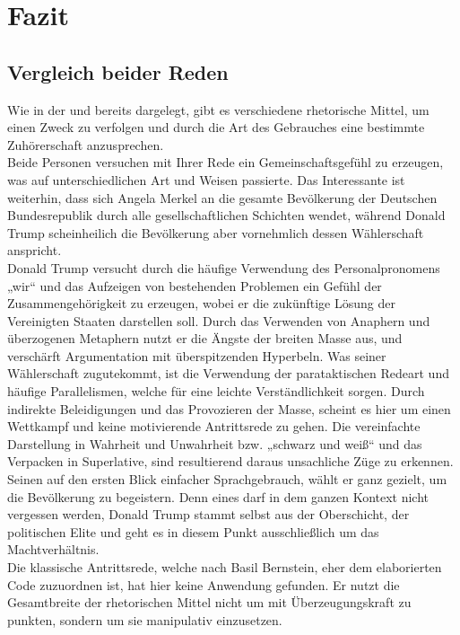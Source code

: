 \section{Fazit} 
\label{sec: Fazit}

\subsection{Vergleich beider Reden}
\label{sec: Vergleich beider Reden}

Wie in der  und  bereits dargelegt, gibt es verschiedene rhetorische Mittel, um einen Zweck zu verfolgen und durch die Art des Gebrauches eine bestimmte Zuhörerschaft anzusprechen. \\Beide Personen versuchen mit Ihrer Rede ein Gemeinschaftsgefühl zu erzeugen, was auf unterschiedlichen Art und Weisen passierte. Das Interessante ist weiterhin, dass sich Angela Merkel an die gesamte Bevölkerung der Deutschen Bundesrepublik durch alle gesellschaftlichen Schichten wendet, während Donald Trump scheinheilich die Bevölkerung aber vornehmlich dessen Wählerschaft anspricht.
\\Donald Trump versucht durch die häufige Verwendung des Personalpronomens „wir“ und das Aufzeigen von bestehenden Problemen ein Gefühl der Zusammengehörigkeit zu erzeugen, wobei er die zukünftige Lösung der Vereinigten Staaten darstellen soll. Durch das Verwenden von Anaphern und überzogenen Metaphern nutzt er die Ängste der breiten Masse aus, und verschärft Argumentation mit überspitzenden Hyperbeln. Was seiner Wählerschaft zugutekommt, ist die Verwendung der parataktischen Redeart und häufige Parallelismen,  welche für eine leichte Verständlichkeit sorgen. Durch indirekte Beleidigungen und das Provozieren der Masse, scheint es hier um einen Wettkampf und keine motivierende Antrittsrede zu gehen. Die vereinfachte Darstellung in Wahrheit und Unwahrheit bzw. „schwarz und weiß“ und das Verpacken in Superlative, sind resultierend daraus unsachliche Züge zu erkennen. Seinen auf den ersten Blick einfacher Sprachgebrauch, wählt er ganz gezielt, um die Bevölkerung zu begeistern. Denn eines darf in dem ganzen Kontext nicht vergessen werden, Donald Trump stammt selbst aus der Oberschicht, der politischen Elite und geht es in diesem Punkt ausschließlich um das Machtverhältnis. \\Die klassische Antrittsrede, welche nach Basil Bernstein, eher dem elaborierten Code zuzuordnen ist, hat hier keine Anwendung gefunden. Er nutzt die Gesamtbreite der rhetorischen Mittel nicht um mit Überzeugungskraft zu punkten, sondern um sie manipulativ einzusetzen.

